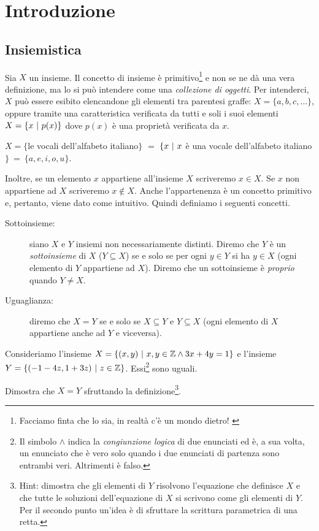 \chapter{Introduzione}
	\section{Insiemistica}
		Sia $X$ un insieme. Il concetto di insieme è primitivo\footnote{Facciamo finta che lo sia, in realtà c'è un mondo dietro! \label{primitivo}} e non se ne dà una vera definizione, ma lo si può intendere come una \emph{collezione di oggetti}. Per intenderci, $X$ può essere esibito elencandone gli elementi tra parentesi graffe: $X=\{a,b,c,\ldots\}$, oppure tramite una caratteristica verificata da tutti e soli i suoi elementi $X=\{x\ \rvert\  p(x)\}$ dove $p(x)$ è una proprietà verificata da $x$.
		\begin{eg}
			$X=\{$le vocali dell'alfabeto italiano$\}$ $=$ $\{x\ \rvert\  x$ è una vocale dell'alfabeto italiano$\}\ =\ \{a,e,i,o,u\}$.
		\end{eg}
		Inoltre, se un elemento $x$ appartiene all'insieme $X$ scriveremo $x\in X$. Se $x$ non appartiene ad $X$ scriveremo $x\nin X$. Anche l'appartenenza è un concetto primitivo e, pertanto, viene dato come intuitivo. Quindi definiamo i seguenti concetti.
		\begin{description}
			\item[Sottoinsieme:] siano $X$ e $Y$ insiemi non necessariamente distinti. Diremo che $Y$ è un \emph{sottoinsieme} di $X$ ($Y\subseteq X$) se e solo se per ogni $y\in Y$ si ha $y \in X$ (ogni elemento di $Y$ appartiene ad $X$). Diremo che un sottoinsieme è \emph{proprio} quando $Y\neq X$.
			\item[Uguaglianza:] diremo che $X=Y$ se e solo se $X\subseteq Y$ e $Y\subseteq X$ (ogni elemento di $X$ appartiene anche ad $Y$ e viceversa).
		\end{description}
		\begin{eg}
			Consideriamo l'insieme $X=\{(x,y)\ \rvert\  x,y\in\mathbb{Z} \land 3x+4y=1\}$ e l'insieme $Y=\{(-1-4z, 1+3z)\ \rvert\  z\in\mathbb{Z}\}$. Essi\footnote{Il simbolo $\land$ indica la \emph{congiunzione logica} di due enunciati ed è, a sua volta, un enunciato che è vero solo quando i due enunciati di partenza sono entrambi veri. Altrimenti è falso.} sono uguali.
		\end{eg}
		\begin{es}
			Dimostra che $X=Y$ sfruttando la definizione\footnote{Hint: dimostra che gli elementi di $Y$ risolvono l'equazione che definisce $X$ e che tutte le soluzioni dell'equazione di $X$ si scrivono come gli elementi di $Y$. Per il secondo punto un'idea è di sfruttare la scrittura parametrica di una retta.}.
		\end{es}		
